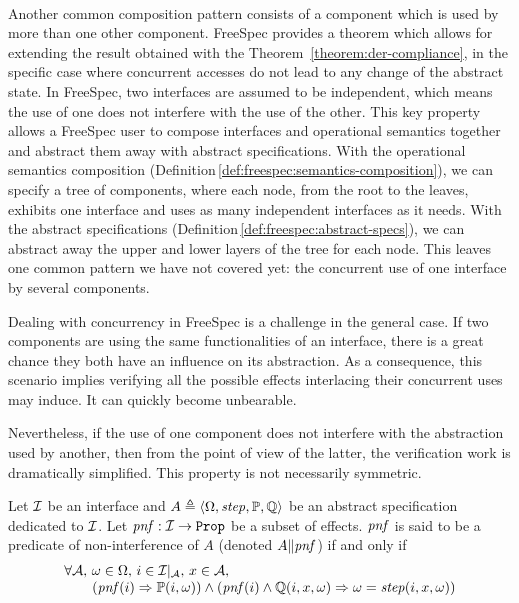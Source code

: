\paragraph{}
%
Another common composition pattern consists of a component which is used by more
than one other component.
%
FreeSpec provides a theorem which allows for extending the result obtained with
the Theorem~\ref{theorem:der-compliance}, in the specific case where concurrent
accesses do not lead to any change of the abstract state.
%
In FreeSpec, two interfaces are assumed to be independent, which means the use
of one does not interfere with the use of the other.
%
This key property allows a FreeSpec user to compose interfaces and operational
semantics together and abstract them away with abstract specifications.
%
With the operational semantics composition
(Definition\,\ref{def:freespec:semantics-composition}), we can specify a tree of
components, where each node, from the root to the leaves, exhibits one interface
and uses as many independent interfaces as it needs.
%
With the abstract specifications
(Definition\,\ref{def:freespec:abstract-specs}), we can abstract away the upper
and lower layers of the tree for each node.
%
This leaves one common pattern we have not covered yet: the concurrent use of
one interface by several components.

Dealing with concurrency in FreeSpec is a challenge in the general case.
%
If two components are using the same functionalities of an interface, there is a
great chance they both have an influence on its abstraction.
%
As a consequence, this scenario implies verifying all the possible effects
interlacing their concurrent uses may induce. It can quickly become unbearable.

Nevertheless, if the use of one component does not interfere with the
abstraction used by another, then from the point of view of the latter, the
verification work is dramatically simplified.
%
This property is not necessarily symmetric.

\begin{definition}
  Let $\mathcal{I}$ be an interface and
  $A \triangleq \langle \Omega, \mathit{step}, \mathbb{P}, \mathbb{Q} \rangle$
  be an abstract specification dedicated to $\mathcal{I}$. Let
  $\mathit{pnf} : \mathcal{I} \rightarrow \texttt{Prop}$ be a subset of
  effects. $\mathit{pnf}$ is said to be a predicate of non-interference of
  $A$ (denoted $A \| \mathit{pnf}$) if and only if \[
    \begin{array}{l}
      \forall \mathcal{A}\text{, } \omega \in \Omega\text{, } i \in
      \mathcal{I}|_{\mathcal{A}}\text{, }x \in \mathcal{A}\text{, } \\ \qquad
      (\mathit{pnf}(i) \Rightarrow \mathbb{P}(i, \omega)) \wedge (\mathit{pnf}(i)
      \wedge \mathbb{Q}(i, x, \omega) \Rightarrow \omega = \mathit{step}(i, x,
      \omega))
    \end{array}
  \]
\end{definition}

